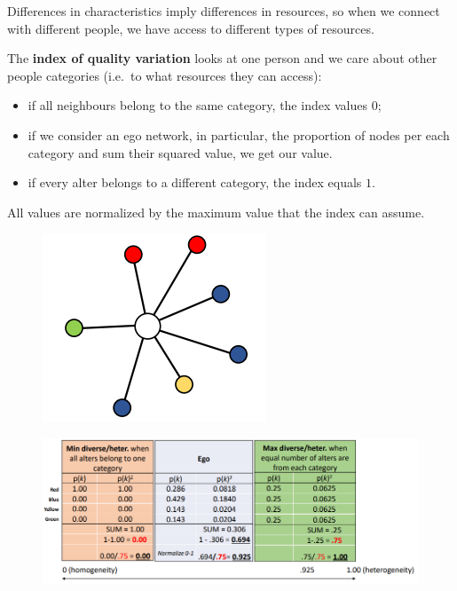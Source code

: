 \documentclass[
  notitlepage,
  onecolumn,
  openany]{book}
\providecommand{\tightlist}{%
  \setlength{\itemsep}{0pt}\setlength{\parskip}{0pt}}
\begin{document}
Differences in characteristics imply differences in resources, so when we connect with different people, we have access to different types of resources.

The \textbf{index of quality variation} looks at one person and we care about other people categories (i.e.~to what resources they can access):

\begin{itemize}
\tightlist
\item
  if all neighbours belong to the same category, the index values \(0\);
\item
  if we consider an ego network, in particular, the proportion of nodes per each category and sum their squared value, we get our value.
\item
  if every alter belongs to a different category, the index equals \(1\).
\end{itemize}

All values are normalized by the maximum value that the index can assume.

\begin{figure}[h!]

{\centering \includegraphics[width=0.3\linewidth]{images/06-Attributes based measures/Untitled 5} 

}

\end{figure}

\begin{figure}[h!]

{\centering \includegraphics[width=0.8\linewidth]{images/06-Attributes based measures/Untitled 6} 

}

\end{figure}
\end{document}
